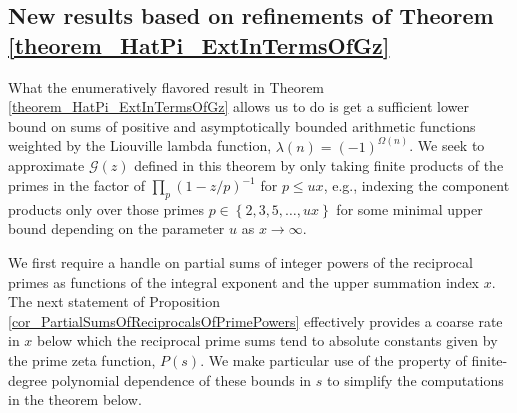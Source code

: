\documentclass[11pt,reqno,a4letter]{article}
\numberwithin{figure}{section}
\numberwithin{table}{section}
\theoremstyle{plain}
\numberwithin{theorem}{section}
\theoremstyle{definition}
\begin{document}
\subsection{New results based on refinements of Theorem \ref{theorem_HatPi_ExtInTermsOfGz}} 
\label{subSection_PartialPrimeProducts_Proofs} 

What the enumeratively flavored result 
in Theorem \ref{theorem_HatPi_ExtInTermsOfGz} allows us to do is get a 
sufficient lower bound on sums of positive and asymptotically bounded arithmetic functions 
weighted by the Liouville lambda function, $\lambda(n) = (-1)^{\Omega(n)}$. 
We seek to approximate $\mathcal{G}(z)$ defined in this theorem 
by only taking finite products of the primes in the factor of 
$\prod_{p} (1 - z/p)^{-1}$ for 
$p \leq ux$, e.g., indexing the component products only over those primes 
$p \in \left\{2,3,5,\ldots,ux\right\}$ for some minimal upper bound 
depending on the parameter $u$ as $x \rightarrow \infty$. 

We first require a handle on partial sums of integer powers of the reciprocal primes as 
functions of the integral exponent and the upper summation index $x$. 
The next statement of Proposition \ref{cor_PartialSumsOfReciprocalsOfPrimePowers} 
effectively provides a coarse rate in $x$ below which the reciprocal prime sums tend to 
absolute constants given by the prime zeta function, $P(s)$. We make particular use of the property 
of finite-degree polynomial dependence of these bounds in $s$ 
to simplify the computations in the theorem below. 
\end{document}
